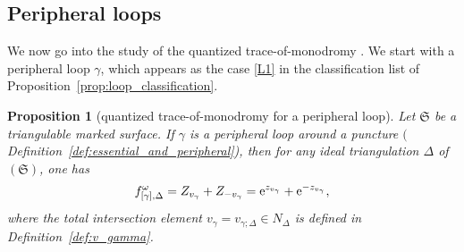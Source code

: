 \documentclass[pdftex]{sigma}
\numberwithin{equation}{section}
\newtheorem{Proposition}[Theorem]{Proposition}
\theoremstyle{definition}
\begin{document}
\subsection{Peripheral loops}
We now go into the study of the quantized trace-of-monodromy . We start with a peripheral loop $\gamma$, which appears as the case \ref{L1} in the classification list of Proposition~\ref{prop:loop_classification}.
\begin{Proposition}[quantized trace-of-monodromy for a peripheral loop]
\label{prop:quantized_trace-of-monodromy_peripheral}
Let $\mathfrak{S}$ be a triangulable marked surface. If $\gamma$ is a peripheral loop around a puncture $($Definition~{\rm \ref{def:essential_and_peripheral})}, then for any ideal triangulation $\Delta$ of $(\mathfrak{S})$, one has
\begin{align*}
f^\omega_{[\gamma],\Delta} = Z_{v_\gamma} + Z_{-v_\gamma} = {\rm e}^{z_{v_\gamma}} + {\rm e}^{-z_{v_\gamma}},
\end{align*}
where the total intersection element $v_\gamma = v_{\gamma;\Delta} \in N_\Delta$ is defined in Definition~{\rm \ref{def:v_gamma}}.
\end{Proposition}
\end{document}
